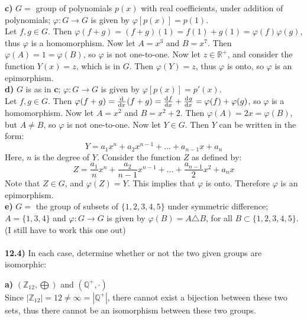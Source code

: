 \documentclass{scrartcl}
\begin{document}
\textbf{c)} $G=$ group of polynomials $p(x)$ with real coefficients, under
addition of polynomials; $\varphi : G \rightarrow G$ is given by 
$\varphi[p(x)]=p(1)$.\\

Let $f,g \in G$. Then $\varphi(f+g)=(f+g)(1)=f(1)+g(1)=\varphi(f)\varphi(g)$,
thus $\varphi$ is a homomorphism. Now let $A = x^3$ and $B=x^7$. Then
$\varphi(A)=1=\varphi(B)$, so $\varphi$ is not one-to-one. Now let $z \in
\mathbb{R}^+$, and consider the function $Y(x)=z$, which is in $G$. Then
$\varphi(Y)=z$, thus $\varphi$ is onto, so $\varphi$ is an epimorphism.\\

\textbf{d)} $G$ is as in \textbf{c}; $\varphi : G \rightarrow G$ is given by
$\varphi[p(x)]=p'(x)$.\\

Let $f,g \in G$. Then $\varphi(f+g)=\od{}{x}(f+g)=\od{f}{x}+\od{g}{x}=\varphi(f)
+\varphi(g)$, so $\varphi$ is a homomorphism. Now let $A = x^2$ and
$B = x^2 + 2$. Then $\varphi(A) = 2x = \varphi(B)$, but $A \neq B$, so $\varphi$
is not one-to-one. Now let $Y \in G$. Then $Y$ can be written in the form:
\begin{displaymath}
Y = a_1x^n + a_2x^{n-1} + ... + a_{n-1}x + a_n
\end{displaymath}
Here, $n$ is the degree of $Y$. Consider the function $Z$ as defined by:
\begin{displaymath}
Z = \frac{a_1}{n}x^n + \frac{a_2}{n-1}x^{n-1} + ... + \frac{a_{n-1}}{2}x^2 + a_nx
\end{displaymath}
Note that $Z \in G$, and $\varphi(Z) = Y$. This implies that $\varphi$ is onto.
Therefore $\varphi$ is an epimorphism.\\

\textbf{e)} $G=$ the group of subsets of $\{1,2,3,4,5\}$ under symmetric
difference; $A = \{1,3,4\}$ and $\varphi : G \rightarrow G$ is given by
$\varphi(B) = A \triangle B$, for all $B \subset \{1,2,3,4,5\}$.\\

(I still have to work this one out)\\\\
\textbf{12.4)} In each case, determine whether or not the two given groups are
               isomorphic:

\textbf{a)} $(\mathbb{Z}_{12},\bigoplus)$ and $(\mathbb{Q}^+,\cdot)$\\

Since $|\mathbb{Z}_{12}| = 12 \neq \infty = |\mathbb{Q}^+|$, there cannot exist
a bijection between these two sets, thus there cannot be an isomorphism between
these two groups.\\
\end{document}
